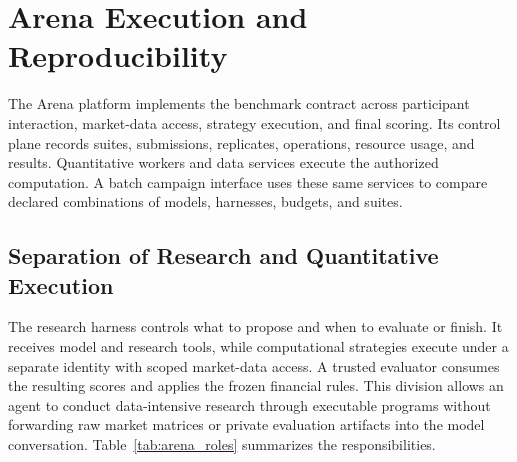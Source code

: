 \section{Arena Execution and Reproducibility}
\label{sec:arena}

The Arena platform implements the benchmark contract across participant interaction, market-data access, strategy execution, and final scoring. Its control plane records suites, submissions, replicates, operations, resource usage, and results. Quantitative workers and data services execute the authorized computation. A batch campaign interface uses these same services to compare declared combinations of models, harnesses, budgets, and suites.

\subsection{Separation of Research and Quantitative Execution}
\label{sec:arena_execution}

The research harness controls what to propose and when to evaluate or finish. It receives model and research tools, while computational strategies execute under a separate identity with scoped market-data access. A trusted evaluator consumes the resulting scores and applies the frozen financial rules. This division allows an agent to conduct data-intensive research through executable programs without forwarding raw market matrices or private evaluation artifacts into the model conversation. Table~\ref{tab:arena_roles} summarizes the responsibilities.

